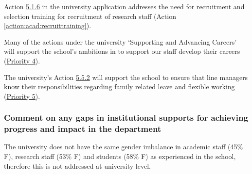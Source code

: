 

Action \hyperlink{act516}{5.1.6} in the university application addresses the need for recruitment and selection training for recruitment of research staff (Action~%
\ref{action:acad:recruittraining}).  


Many of the actions under the university ‘Supporting and Advancing Careers’ will support the school’s ambitions in to support our staff develop their careers (\hyperlink{priority:4}{Priority 4}). 

The university's Action \hyperlink{act552}{5.5.2} will support the school to ensure that line managers know their responsibilities regarding family related leave and flexible working (\hyperlink{priority:5}{Priority 5}).  



\subsubsection{Comment on any gaps in institutional supports for achieving progress and impact in the department}

The university does not have the same gender imbalance in academic staff (45\% F), research staff (53\% F) and students (58\% F) as experienced in the school, therefore this is not addressed at university level.